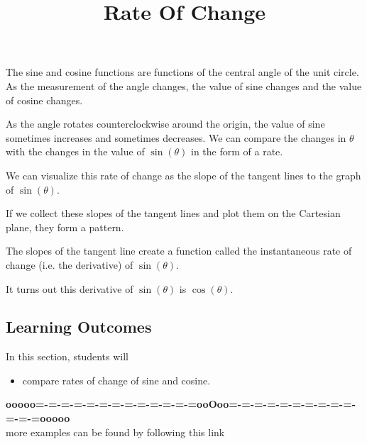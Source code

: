 \documentclass{ximera}
\title{Rate Of Change}
\begin{document}
\begin{abstract}
%
\end{abstract}
\maketitle




The sine and cosine functions are functions of the central angle of the unit circle.  As the measurement of the angle changes, the value of sine changes and the value of cosine changes.  


As the angle rotates counterclockwise around the origin, the value of sine sometimes increases and sometimes decreases.  We can compare the changes in $\theta$ with the changes in the value of $\sin(\theta)$ in the form of a rate. 

We can visualize this rate of change as the slope of the tangent lines to the graph of $\sin(\theta)$.

If we collect these slopes of the tangent lines and plot them on the Cartesian plane, they form a pattern.


The slopes of the tangent line create a function called the instantaneous rate of change (i.e. the derivative) of $\sin(\theta)$.

It turns out this derivative of $\sin(\theta)$ is $\cos(\theta)$.












\subsection{Learning Outcomes}

\begin{sectionOutcomes}
In this section, students will 

\begin{itemize}
\item compare rates of change of sine and cosine.
\end{itemize}
\end{sectionOutcomes}








\begin{center}
\textbf{\textcolor{green!50!black}{ooooo=-=-=-=-=-=-=-=-=-=-=-=-=ooOoo=-=-=-=-=-=-=-=-=-=-=-=-=ooooo}} \\

more examples can be found by following this link\\ 

\end{center}
\end{document}
